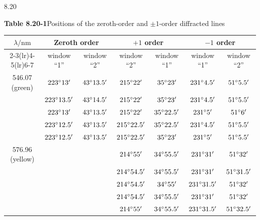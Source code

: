 \begin{figbox}{8.20}
\end{figbox}

\begin{center}
\textbf{Table 8.20-1}\quad Positions of the zeroth-order and $\pm1$-order diffracted lines\\[3pt]
{\footnotesize\setlength{\tabcolsep}{3.5pt}
\begin{tabular}{ccccccc}
\toprule
$\lambda/\mathrm{nm}$ & \multicolumn{2}{c}{Zeroth order} & \multicolumn{2}{c}{$+1$ order} & \multicolumn{2}{c}{$-1$ order} \\
\cmidrule(lr){2-3}\cmidrule(lr){4-5}\cmidrule(lr){6-7}
 & window ``1'' & window ``2'' & window ``2'' & window ``1'' & window ``1'' & window ``2'' \\
\midrule
546.07 (green) & $223^{\circ}13'$ & $43^{\circ}13.5'$ & $215^{\circ}22'$ & $35^{\circ}23'$ & $231^{\circ}4.5'$ & $51^{\circ}5.5'$ \\
 & $223^{\circ}13.5'$ & $43^{\circ}14.5'$ & $215^{\circ}22'$ & $35^{\circ}23'$ & $231^{\circ}4.5'$ & $51^{\circ}5.5'$ \\
 & $223^{\circ}13'$ & $43^{\circ}13.5'$ & $215^{\circ}22'$ & $35^{\circ}22.5'$ & $231^{\circ}5'$ & $51^{\circ}6'$ \\
 & $223^{\circ}12.5'$ & $43^{\circ}13.5'$ & $215^{\circ}22.5'$ & $35^{\circ}22.5'$ & $231^{\circ}4.5'$ & $51^{\circ}5.5'$ \\
 & $223^{\circ}12.5'$ & $43^{\circ}13.5'$ & $215^{\circ}22.5'$ & $35^{\circ}23'$ & $231^{\circ}5'$ & $51^{\circ}5.5'$ \\
\midrule
576.96 (yellow) & & & $214^{\circ}55'$ & $34^{\circ}55.5'$ & $231^{\circ}31'$ & $51^{\circ}32'$ \\
 & & & $214^{\circ}54.5'$ & $34^{\circ}55.5'$ & $231^{\circ}31'$ & $51^{\circ}31.5'$ \\
 & & & $214^{\circ}54.5'$ & $34^{\circ}55'$ & $231^{\circ}31.5'$ & $51^{\circ}32'$ \\
 & & & $214^{\circ}54.5'$ & $34^{\circ}55.5'$ & $231^{\circ}31'$ & $51^{\circ}32'$ \\
 & & & $214^{\circ}55'$ & $34^{\circ}55.5'$ & $231^{\circ}31.5'$ & $51^{\circ}32.5'$ \\
\bottomrule
\end{tabular}
}
\end{center}

